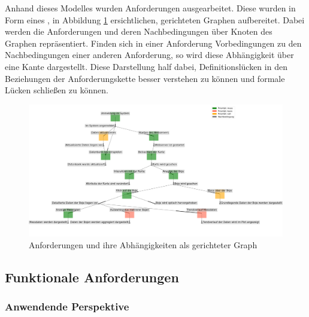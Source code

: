     Anhand dieses Modelles  wurden Anforderungen ausgearbeitet. Diese wurden in Form eines , in Abbildung \ref{fig:graph_anforderungen} ersichtlichen, gerichteten Graphen aufbereitet. Dabei werden die Anforderungen und deren Nachbedingungen über Knoten des Graphen repräsentiert. Finden sich in einer Anforderung Vorbedingungen zu den Nachbedingungen einer anderen Anforderung, so wird diese Abhängigkeit über eine Kante dargestellt. Diese Darstellung half dabei, Definitionslücken in den Beziehungen  der Anforderungskette besser verstehen zu können und formale Lücken schließen zu können.
      
    \begin{figure}[h!]
    \centering
    \includegraphics[width=0.9\textheight, angle=90]{pix/graph_anforderungen.png}
    \caption{Anforderungen und ihre Abhängigkeiten als gerichteter Graph}
    \label{fig:graph_anforderungen}
    \end{figure}
    
     
    \subsection{Funktionale Anforderungen}
    
    \subsubsection{Anwendende Perspektive}
    
